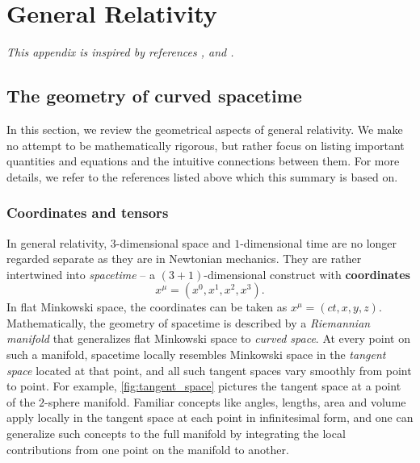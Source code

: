 \appendix
\renewcommand{\chaptername}{\appendixname}

\chapter{General Relativity}
\label{chap:gr}

\textit{This appendix is inspired by references \cite{ref:carroll}, \cite{ref:mtw} and \cite{ref:mika_gr_notes}.}

\section{The geometry of curved spacetime}
\label{chap:gr_summary} %

\newcommand\pdvx[2]{\pdv{x^{#1}}{x^{#2}}}

In this section, we review the geometrical aspects of general relativity.
We make no attempt to be mathematically rigorous, but rather focus on listing important quantities and equations and the intuitive connections between them.
For more details, we refer to the references listed above which this summary is based on.

\subsection{Coordinates and tensors}

In general relativity, $3$-dimensional space and $1$-dimensional time are no longer regarded separate as they are in Newtonian mechanics.
They are rather intertwined into \emph{spacetime} -- a $(3+1)$-dimensional construct with \textbf{coordinates}
\begin{equation}
	x^\mu = (x^0, x^1, x^2, x^3) .
\end{equation}
In flat Minkowski space, the coordinates can be taken as $x^\mu = (ct, x, y, z)$.
Mathematically, the geometry of spacetime is described by a \emph{Riemannian manifold} that generalizes flat Minkowski space to \emph{curved space}.
At every point on such a manifold, spacetime locally resembles Minkowski space in the \emph{tangent space} located at that point, and all such tangent spaces vary smoothly from point to point.
For example, \cref{fig:tangent_space} pictures the tangent space at a point of the $2$-sphere manifold.
Familiar concepts like angles, lengths, area and volume apply locally in the tangent space at each point in infinitesimal form, and one can generalize such concepts to the full manifold by integrating the local contributions from one point on the manifold to another.

